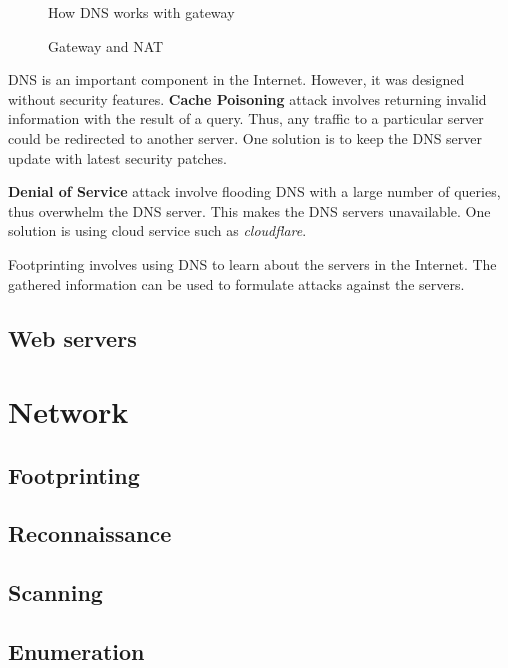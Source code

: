 \documentclass[7x9]{times}
\begin{document}
\begin{figure}[ht]
    \centering
    \def\svgwidth{.85\textwidth}
    
    \caption{How DNS works with gateway}
\end{figure}

\begin{figure}[ht]
    \centering
    \def\svgwidth{.85\textwidth}
    
    \caption{Gateway and NAT}
\end{figure}

DNS is an important component in the Internet. However, it
was designed without security features. \textbf{Cache
    Poisoning} attack involves returning invalid information
with the result of a query. Thus, any traffic to a
particular server could be redirected to another server. 
One solution is to keep the DNS server update with latest 
security patches.

\textbf{Denial of Service} attack involve flooding DNS with
a large number of queries, thus overwhelm the DNS server.
This  makes the DNS servers unavailable. One solution is 
using cloud service such as \textit{cloudflare}.

Footprinting involves using DNS  to learn about the servers
in the Internet. The gathered information can be used to 
formulate attacks against the servers.








\section{Web servers}


\chapter{Network}

\section{Footprinting}

\section{Reconnaissance}
\section{Scanning}
\section{Enumeration}
\end{document}
